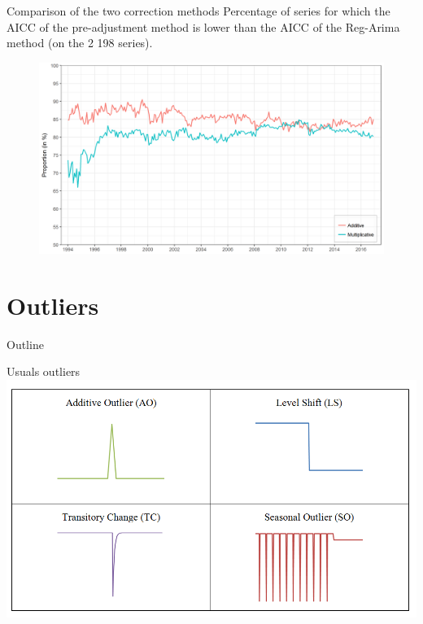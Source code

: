 \documentclass[10pt, handout]{beamer}
\begin{document}
\begin{frame}{Comparison of the two correction methods}
\footnotesize
Percentage of series for which the AICC of the pre-adjustment method is lower than the AICC of the Reg-Arima method (on the 2 198 series).
\normalsize
\begin{figure}
\centering
\includegraphics[width = \textwidth]{img/LYaicc.png}
\end{figure}
\end{frame}

\section{Outliers}
\begin{frame}{Outline}
\end{frame}

\begin{frame}{Usuals outliers}
\centering
\includegraphics[width = \textwidth]{img/Outliers.png}
\end{frame}
\end{document}
